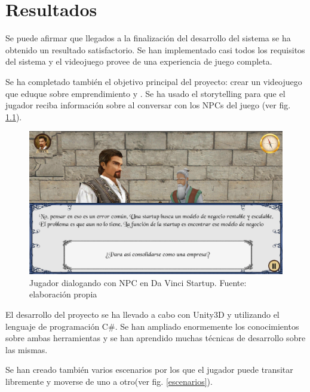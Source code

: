 \chapter{Resultados}

Se  puede afirmar que llegados a la finalización del desarrollo del sistema se ha obtenido un resultado satisfactorio. Se han implementado casi todos los requisitos del sistema y el videojuego provee de una experiencia de juego completa.

Se ha completado también el objetivo principal del proyecto: crear un videojuego que eduque sobre emprendimiento y . Se ha usado el storytelling para que el jugador reciba información sobre  al conversar con los NPCs del juego (ver fig. \ref{dialogo}).

\begin{figure}
\begin{center}
\includegraphics[scale=0.5]{imagenes/dialogo.png}
\caption{Jugador dialogando con NPC en Da Vinci Startup.  Fuente: elaboración propia}
\label{dialogo}
\end{center}
\end{figure}

El desarrollo del proyecto se ha llevado a cabo con Unity3D y utilizando el lenguaje de programación C\#. Se han ampliado enormemente los conocimientos sobre ambas herramientas y se han aprendido muchas técnicas de desarrollo sobre las mismas.

Se han creado también varios  escenarios por los que el jugador puede transitar libremente y moverse de uno a otro(ver fig. \ref{escenarios}).

